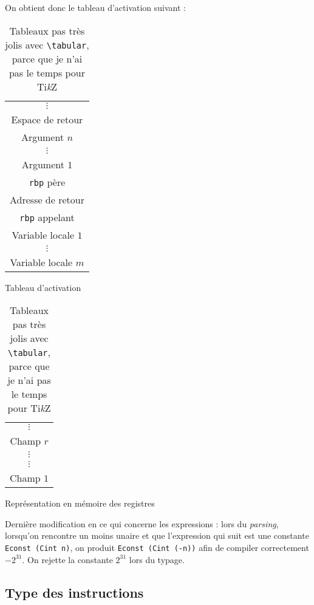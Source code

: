 \documentclass[a4paper, 10pt, french]{article}
\newcommand{\codeOCaml}[1]{\texttt{#1}}
\newcommand{\codeASM}[1]{\texttt{#1}}
\newcommand{\code}[1]{\texttt{#1}}
\newcommand{\foreign}{\emph}
\begin{document}
On obtient donc le tableau d'activation suivant :
\begin{table}[H]
 \centering
 \begin{subtable}[h]{.45\linewidth}
 \centering
 \begin{tabular}{|c|}
 \hline
 $\vdots$ \\
 Espace de retour \\
 \hline
 Argument $n$ \\
 \hline
 $\vdots$ \\
 \hline
 Argument $1$ \\
 \hline
 \codeASM{rbp} père \\
 \hline \hline
 Adresse de retour \\
 \hline
 \codeASM{rbp} appelant \\
 \hline
 Variable locale $1$ \\
 \hline
 $\vdots$ \\
 \hline
 Variable locale $m$ \\
 \hline
\end{tabular}
\caption{Tableau d'activation}
\end{subtable}
\begin{subtable}[h]{.45\linewidth}
 \centering
 \begin{tabular}{|c|}
  \hline
  $\vdots$ \\
  Champ $r$ \\
  \hline
  $\vdots$ \\
  \hline
  $\vdots$ \\
  Champ $1$\\
  \hline
 \end{tabular}

 \caption{Représentation en mémoire des registres}
\end{subtable}
\caption{Tableaux pas très jolis avec \code{\textbackslash tabular}, parce que je n'ai pas le temps pour Ti\emph{k}Z}
\end{table}

Dernière modification en ce qui concerne les expressions : lors du \foreign{parsing}, lorsqu'on rencontre un moins unaire et que l'expression qui suit est une constante \codeOCaml{Econst (Cint n)}, on produit \codeOCaml{Econst (Cint (-n))} afin de compiler correctement $-2^{31}$. On rejette la constante $2^{31}$ lors du typage.


\subsection{Type des instructions}
\end{document}
